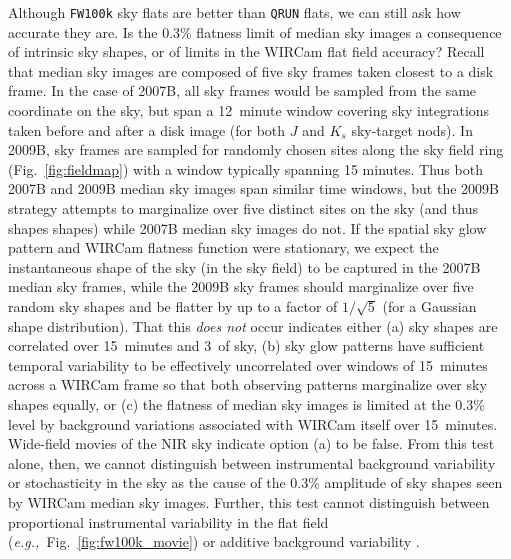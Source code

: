 \documentclass[iop]{emulateapj}
\newcommand{\eg}{\textit{e.g.,~}}
\newcommand{\mycomment}[1]{\textcolor{OliveGreen}{\textit{#1}}} %
\newcommand{\Fig}[1]{Fig.~\ref{fig:#1}}  %
\begin{document}
Although \texttt{FW100k} sky flats are better than \texttt{QRUN} flats, we can still ask how accurate they are.
Is the 0.3\% flatness limit of median sky images a consequence of intrinsic sky shapes, or of limits in the WIRCam flat field accuracy?
Recall that median sky images are composed of five sky frames taken closest to a disk frame.
In the case of 2007B, all sky frames would be sampled from the same coordinate on the sky, but span a 12~minute window covering sky integrations taken before and after a disk image (for both $J$ and $K_s$ sky-target nods).
In 2009B, sky frames are sampled for randomly chosen sites along the sky field ring (\Fig{fieldmap}) with a window typically spanning 15 minutes.
Thus both 2007B and 2009B median sky images span similar time windows, but the 2009B strategy attempts to marginalize over five distinct sites  on the sky (and thus shapes shapes) while 2007B median sky images do not.
If the spatial sky glow pattern and WIRCam flatness function were stationary, we expect the instantaneous shape of the sky (in the sky field) to be captured in the 2007B median sky frames, while the 2009B sky frames should marginalize over five random sky shapes and be flatter by up to a factor of $1/\sqrt{5}$ (for a Gaussian shape distribution).
That this \emph{does not} occur indicates either (a) sky shapes are correlated over 15~minutes and 3\arcdeg\ of sky, (b) sky glow patterns have sufficient temporal variability to be effectively uncorrelated over windows of 15~minutes across a WIRCam frame so that both observing patterns marginalize over sky shapes equally, or (c) the flatness of median sky images is limited at the 0.3\% level by background variations associated with WIRCam itself over 15~minutes.
Wide-field movies of the NIR sky \citep{Adams:1996} indicate option (a) to be false.
From this test alone, then, we cannot distinguish between instrumental background variability or stochasticity in the sky as the cause of the 0.3\% amplitude of sky shapes seen by WIRCam median sky images.
Further, this test cannot distinguish between proportional instrumental variability in the flat field (\eg \Fig{fw100k_movie}) or additive background variability \citep[as seen in the CFHT-IR camera][]{Vaduvescu:2004}.
\end{document}
